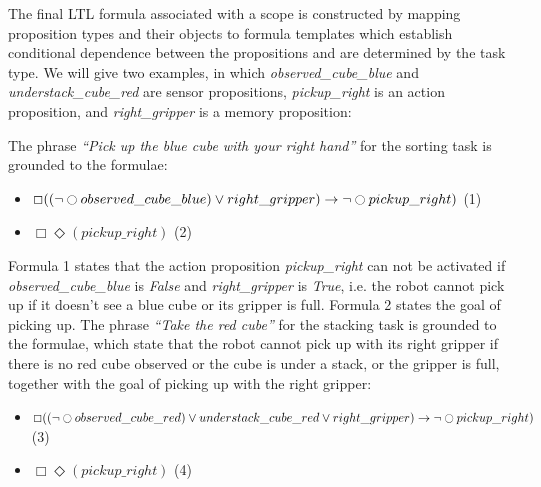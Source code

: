 \documentclass[letterpaper]{article} %
\begin{document}
The final LTL formula associated with a scope is constructed by mapping proposition types and their objects to formula templates which establish conditional dependence between the propositions and are determined by the task type. We will give two examples, in which \textit{observed\_cube\_blue} and \textit{understack\_cube\_red} are sensor propositions, \textit{pickup\_right} is an action proposition, and \textit{right\_gripper} is a memory proposition:

The phrase \textit{``Pick up the blue cube with your right hand''} for the sorting task is grounded to the formulae:

\begin{flushleft}
\begin{itemize}[nolistsep,noitemsep]
\item $\Box ( ( \neg \ocircle observed\_cube\_blue) \lor right\_gripper ) \to  \neg \ocircle pickup\_right ) $ (1)
\item $\Box \Diamond (pickup\_right)$ (2)
\end{itemize}
\end{flushleft}

Formula 1 states that the action proposition \textit{pickup\_right} can not be activated if \textit{observed\_cube\_blue} is \textit{False} and \textit{right\_gripper} is \textit{True}, i.e. the robot cannot pick up if it doesn't see a blue cube or its gripper is full. Formula 2 states the goal of picking up.
The phrase \textit{``Take the red cube''} for the stacking task is grounded to the formulae, which state that the robot cannot pick up with its right gripper if there is no red cube observed or the cube is under a stack, or the gripper is full, together with the goal of picking up with the right gripper:
\begin{flushleft}
\begin{itemize}[nolistsep,noitemsep]
\item $\Box ( ( \neg \ocircle observed\_cube\_red) \lor understack\_cube\_red \lor right\_gripper ) \to  \neg \ocircle pickup\_right )$ (3)
\item $\Box \Diamond (pickup\_right)$ (4)
\end{itemize}
\end{flushleft}
\end{document}
